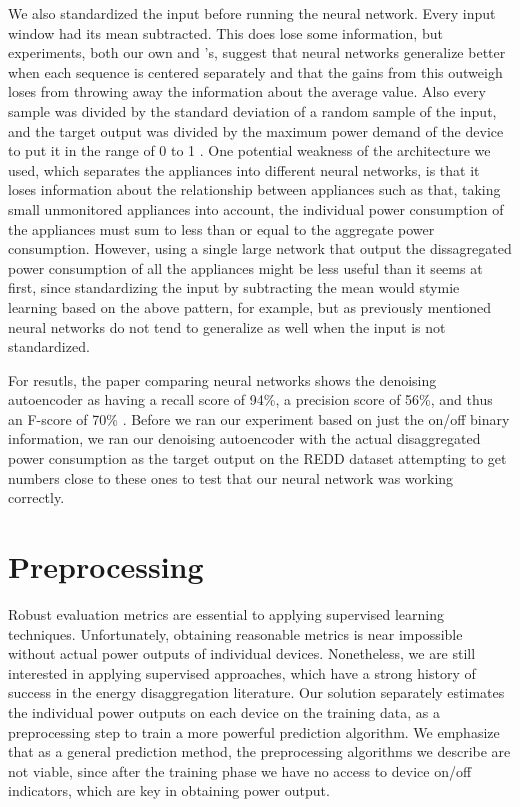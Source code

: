 \documentclass{article}
\begin{document}
We also standardized the input before running the neural network. Every input window had its mean subtracted. This does lose some information, but experiments, both our own and \cite{Kelly}'s, suggest that neural networks generalize better when each sequence is centered separately and that the gains from this outweigh loses from throwing away the information about the average value. Also every sample was divided by the standard deviation of a random sample of the input, and the target output was divided by the maximum power demand of the device to put it in the range of 0 to 1 \cite{Kelly}. One potential weakness of the architecture we used, which separates the appliances into different neural networks, is that it loses information about the relationship between appliances such as that, taking small unmonitored appliances into account, the individual power consumption of the appliances must sum to less than or equal to the aggregate power consumption. However, using a single large network that output the dissagregated power consumption of all the appliances might be less useful than it seems at first, since standardizing the input by subtracting the mean would stymie learning based on the above pattern, for example, but as previously mentioned neural networks do not tend to generalize as well when the input is not standardized.

For resutls, the paper comparing neural networks shows the denoising autoencoder as having a recall score of 94\%, a precision score of 56\%, and thus an F-score of 70\% \cite{Kelly}. Before we ran our experiment based on just the on/off binary information, we ran our denoising autoencoder with the actual disaggregated power consumption as the target output on the REDD dataset attempting to get numbers close to these ones to test that our neural network was working correctly.

\section{Preprocessing}

Robust evaluation metrics are essential to applying supervised learning techniques. Unfortunately, obtaining reasonable metrics is near impossible without actual power outputs of individual devices. Nonetheless, we are still interested in applying supervised approaches, which have a strong history of success in the energy disaggregation literature. Our solution separately estimates the individual power outputs on each device on the training data, as a preprocessing step to train a more powerful prediction algorithm. We emphasize that as a general prediction method, the preprocessing algorithms we describe are not viable, since after the training phase we have no access to device on/off indicators, which are key in obtaining power output.
\end{document}
